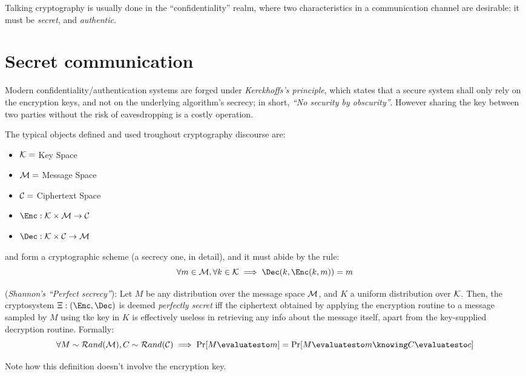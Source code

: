
Talking cryptography is usually done in the ``confidentiality'' realm, where two characteristics in a communication channel are desirable: it must be \emph{secret}, and \emph{authentic}.

\section{Secret communication}


Modern confidentiality/authentication systems are forged under \emph{Kerckhoffs's principle}, which states that a secure system shall only rely on the encryption keys, and not on the underlying algorithm's secrecy; in short, \emph{``No security by obscurity''}. However sharing the key between two parties without the risk of eavesdropping is a costly operation.

The typical objects defined and used troughout cryptography discourse are:
\begin{itemize}
    \item $\mathcal{K} = $ Key Space
    \item $\mathcal{M} = $ Message Space
    \item $\mathcal{C} = $ Ciphertext Space
    \item $\Enc: \K \times \M \to \C$
    \item $\Dec: \K \times \C \to \M$
\end{itemize}

\Enc and \Dec form a cryptographic scheme (a secrecy one, in detail), and it must abide by the rule:
\[
    \forall m \in \M, \forall k \in \K \implies \Dec(k, \Enc(k, m)) = m
\]

\begin{definition}
    (\textit{Shannon's ``Perfect secrecy''}): Let $M$ be any distribution over the message space $\mathcal{M}$, and $K$ a uniform distribution over $\mathcal{K}$. Then, the cryptosystem $\Xi: (\Enc, \Dec)$ is deemed \emph{perfectly secret} iff the ciphertext obtained by applying the encryption routine to a message sampled by $M$ using tke key in $K$ is effectively useless in retrieving any info about the message itself, apart from the key-supplied decryption routine. Formally:
    \[
        \forall M \sim \mathcal{R}and(\M), C \sim \mathcal{R}and(\C) \implies \Pr[M \evaluatesto m] = \Pr[M \evaluatesto m \knowing C \evaluatesto c]
    \]
\end{definition}
Note how this definition doesn't involve the encryption key. %

